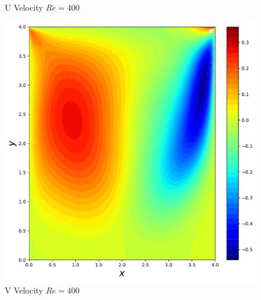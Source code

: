 \documentclass{article}
\begin{document}
\begin{figure}[htb!]
	\caption{U Velocity $Re = 400$}
	\label{fig:u_example1}
	\endminipage\hfill
	\includegraphics[width=\linewidth]{./images/Re400FlowPy_pres_v}
	\caption{V Velocity $Re = 400$}
	\label{fig:v_example1}
	\endminipage
\end{figure}
\end{document}
